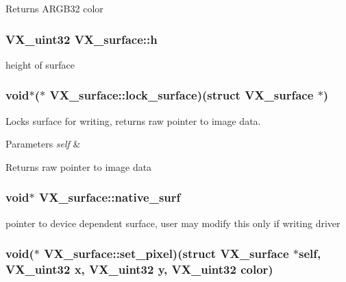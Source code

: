 \begin{DoxyReturn}{Returns}
A\-R\-G\-B32 color 
\end{DoxyReturn}
\hypertarget{structVX__surface_aceb5bfc1d1c476822769082e329b8980}{
\subsubsection[{h}]{\setlength{\rightskip}{0pt plus 5cm}V\-X\-\_\-uint32 V\-X\-\_\-surface\-::h}}\label{structVX__surface_aceb5bfc1d1c476822769082e329b8980}
height of surface \hypertarget{structVX__surface_a869959bbf25e863c3141373df651632d}{
\subsubsection[{lock\-\_\-surface}]{\setlength{\rightskip}{0pt plus 5cm}void$\ast$($\ast$ V\-X\-\_\-surface\-::lock\-\_\-surface)(struct {\bf V\-X\-\_\-surface} $\ast$)}}\label{structVX__surface_a869959bbf25e863c3141373df651632d}
Locks surface for writing, returns raw pointer to image data. 
\begin{DoxyParams}{Parameters}
{\em self} & \\
\hline
\end{DoxyParams}
\begin{DoxyReturn}{Returns}
raw pointer to image data 
\end{DoxyReturn}
\hypertarget{structVX__surface_a8e6a8530748746a2803534d1ea761190}{
\subsubsection[{native\-\_\-surf}]{\setlength{\rightskip}{0pt plus 5cm}void$\ast$ V\-X\-\_\-surface\-::native\-\_\-surf}}\label{structVX__surface_a8e6a8530748746a2803534d1ea761190}
pointer to device dependent surface, user may modify this only if writing driver \hypertarget{structVX__surface_ac748fac37c089a449fad15c684af9a08}{
\subsubsection[{set\-\_\-pixel}]{\setlength{\rightskip}{0pt plus 5cm}void($\ast$ V\-X\-\_\-surface\-::set\-\_\-pixel)(struct {\bf V\-X\-\_\-surface} $\ast$self, V\-X\-\_\-uint32 x, V\-X\-\_\-uint32 y, V\-X\-\_\-uint32 color)}}\label{structVX__surface_ac748fac37c089a449fad15c684af9a08}
